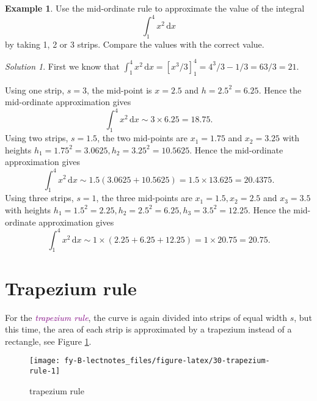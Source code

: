 \documentclass[
  english,
  11pt,
  oneside]{book}
\newcommand{\slide}{}
\theoremstyle{definition}
\theoremstyle{definition}
\newtheorem{example}{Example}[chapter]
\theoremstyle{definition}
\theoremstyle{definition}
\theoremstyle{remark}
\newtheorem*{solution}{Solution}
\begin{document}
\slide

\begin{example}
Use the mid-ordinate rule to approximate the value of the integral
\[
\int_1^4x^2\,\mathrm{d}x
\]
by taking 1, 2 or 3 strips. Compare the values with the correct value.
\end{example}

\begin{solution}
First we know that \(\displaystyle\int_1^4 x^2\,\mathrm{d}x = [x^3/3]_1^4 = 4^3/3-1/3 = 63/3 = 21\).

Using one strip, \(s=3\), the mid-point is \(x=2.5\) and \(h=2.5^2 = 6.25\). Hence the mid-ordinate approximation gives
\[
\int_1^4 x^2 \,\mathrm{d}x \sim 3\times 6.25 = 18.75.
\]
Using two strips, \(s=1.5\), the two mid-points are \(x_1=1.75\) and \(x_2=3.25\) with heights \(h_1=1.75^2=3.0625, h_2=3.25^2=10.5625\). Hence the mid-ordinate approximation gives
\[
\int_1^4 x^2 \,\mathrm{d}x \sim 1.5(3.0625+10.5625)=1.5\times13.625 = 20.4375.
\]
Using three strips, \(s=1\), the three mid-points are \(x_1=1.5, x_2=2.5\) and \(x_3=3.5\) with heights \(h_1=1.5^2=2.25, h_2=2.5^2=6.25, h_3=3.5^2=12.25\). Hence the mid-ordinate approximation gives
\[
\int_1^4 x^2 \,\mathrm{d}x \sim 1\times(2.25+6.25+12.25)=1\times20.75 = 20.75.
\]
\end{solution}

\slide

\begin{slidesonly}

\hbox{}
\slide

\end{slidesonly}

\section{Trapezium rule}\label{trapezium-rule}

For the \textcolor{purple}{\em trapezium rule}, the curve is again divided into strips of equal width \(s\), but this time, the area of each strip is approximated by a trapezium instead of a rectangle, see Figure \ref{fig:30-trapezium-rule}.

\begin{figure}

{\centering \texttt{[image: fy-B-lectnotes\_files/figure-latex/30-trapezium-rule-1]} 

}

\caption{trapezium rule}\label{fig:30-trapezium-rule}
\end{figure}
\end{document}
